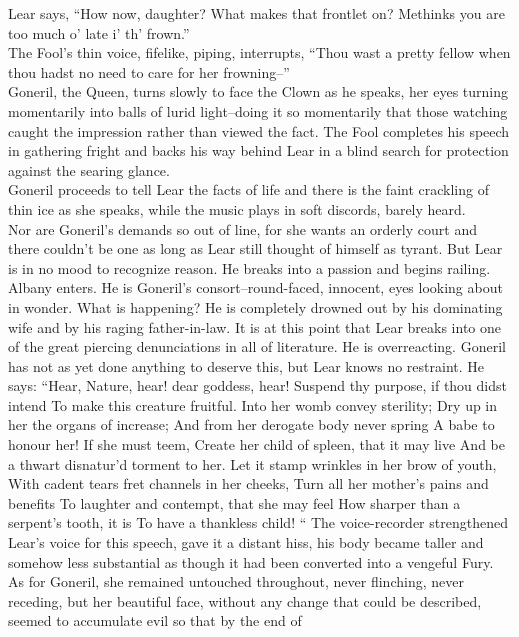 \documentclass[a4paper,12pt]{article}
\begin{document}
Lear says, “How now, daughter? What makes that frontlet on? Methinks you are too much o' late i'
th' frown.”\\
The Fool's thin voice, fifelike, piping, interrupts, “Thou wast a pretty fellow when thou hadst no
need to care for her frowning--”\\
Goneril, the Queen, turns slowly to face the Clown as he speaks, her eyes turning momentarily
into balls of lurid light--doing it so momentarily that those watching caught the impression rather than
viewed the fact. The Fool completes his speech in gathering fright and backs his way behind Lear in a blind
search for protection against the searing glance.\\
Goneril proceeds to tell Lear the facts of life and there is the faint crackling of thin ice as she
speaks, while the music plays in soft discords, barely heard.\\
Nor are Goneril's demands so out of line, for she wants an orderly court and there couldn't be one
as long as Lear still thought of himself as tyrant. But Lear is in no mood to recognize reason. He breaks into
a passion and begins railing.\\
Albany enters. He is Goneril's consort--round-faced, innocent, eyes looking about in wonder.
What is happening? He is completely drowned out by his dominating wife and by his raging father-in-law.
It is at this point that Lear breaks into one of the great piercing denunciations in all of literature. He is
overreacting. Goneril has not as yet done anything to deserve this, but Lear knows no restraint. He says:
“Hear, Nature, hear! dear goddess, hear!
Suspend thy purpose, if thou didst intend
To make this creature fruitful.
Into her womb convey sterility;
Dry up in her the organs of increase;
And from her derogate body never spring
A babe to honour her! If she must teem,
Create her child of spleen, that it may live
And be a thwart disnatur’d torment to her.
Let it stamp wrinkles in her brow of youth,
With cadent tears fret channels in her cheeks,
Turn all her mother’s pains and benefits
To laughter and contempt, that she may feel
How sharper than a serpent’s tooth, it is
To have a thankless child! “
The voice-recorder strengthened Lear’s voice for this speech, gave it a distant hiss, his body
became taller and somehow less substantial as though it had been converted into a vengeful Fury.
As for Goneril, she remained untouched throughout, never flinching, never receding, but her
beautiful face, without any change that could be described, seemed to accumulate evil so that by the end of
\end{document}
